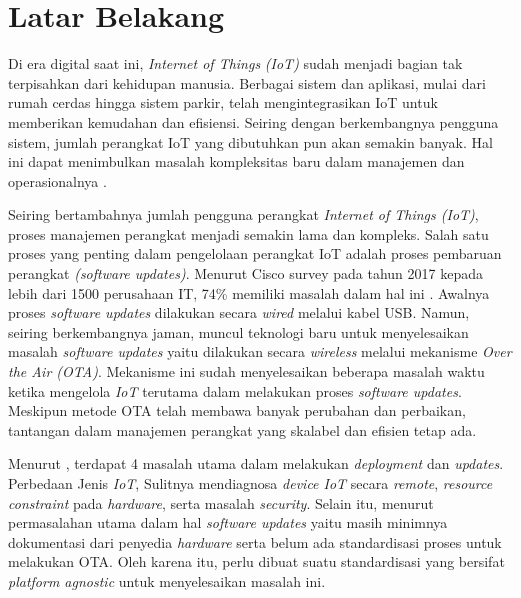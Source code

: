 \section{Latar Belakang}
\label{sec:latar-belakang}

Di era digital saat ini, \textit{Internet of Things} \textit{(IoT)} sudah menjadi bagian tak terpisahkan dari kehidupan manusia. Berbagai sistem dan aplikasi, mulai dari rumah cerdas hingga sistem parkir, telah mengintegrasikan IoT untuk memberikan kemudahan dan efisiensi. Seiring dengan berkembangnya pengguna sistem, jumlah perangkat IoT yang dibutuhkan pun akan semakin banyak. Hal ini dapat menimbulkan masalah kompleksitas baru dalam manajemen dan operasionalnya \parencite{IOTSmartCity}.

Seiring bertambahnya jumlah pengguna perangkat \textit{Internet of Things (IoT)}, proses manajemen perangkat menjadi semakin lama dan kompleks. Salah satu proses yang penting dalam pengelolaan perangkat IoT adalah proses pembaruan perangkat \textit{(software updates)}. Menurut Cisco survey pada tahun 2017 kepada lebih dari 1500 perusahaan IT, 74\% memiliki masalah dalam hal ini \parencite{RemoteDeployment}. Awalnya proses \textit{software updates} dilakukan secara \textit{wired} melalui kabel USB. Namun, seiring berkembangnya jaman, muncul teknologi baru untuk menyelesaikan masalah \textit{software updates} yaitu dilakukan secara \textit{wireless} melalui mekanisme \textit{Over the Air (OTA)}. Mekanisme ini sudah menyelesaikan beberapa masalah waktu ketika mengelola \textit{IoT} terutama dalam melakukan proses \textit{software updates}. Meskipun metode OTA telah membawa banyak perubahan dan perbaikan, tantangan dalam manajemen perangkat yang skalabel dan efisien tetap ada. \parencite{ElJaouhari2022}

Menurut \parencite{RemoteDeployment}, terdapat 4 masalah utama dalam melakukan \textit{deployment} dan \textit{updates}. Perbedaan Jenis \textit{IoT}, Sulitnya mendiagnosa \textit{device IoT} secara \textit{remote}, \textit{resource constraint} pada \textit{hardware}, serta masalah \textit{security}. Selain itu, menurut \parencite{studyovertheair1} permasalahan utama dalam hal \textit{software updates} yaitu masih minimnya dokumentasi dari penyedia \textit{hardware} serta belum ada standardisasi proses untuk melakukan OTA. Oleh karena itu, perlu dibuat suatu standardisasi yang bersifat \textit{platform agnostic} untuk menyelesaikan masalah ini. 

